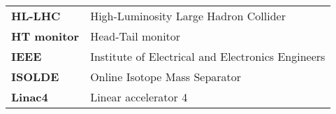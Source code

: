 \begin{flushleft}
\begin{tabular}{l l}
\textbf{HL-LHC} & \qquad\qquad\qquad High-Luminosity Large Hadron Collider \\
\textbf{HT monitor} & \qquad\qquad\qquad Head-Tail monitor \\

\textbf{IEEE} & \qquad\qquad\qquad Institute of Electrical and Electronics Engineers \\

\textbf{ISOLDE} & \qquad\qquad\qquad Online Isotope Mass Separator \\


\textbf{Linac4} & \qquad\qquad\qquad Linear accelerator 4 \\
\end{tabular}
\end{flushleft}


\newpage

